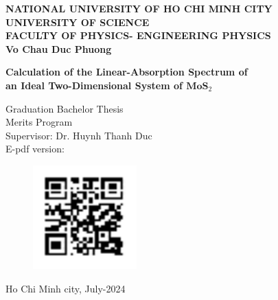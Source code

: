 \documentclass[12pt,english,a4paper]{article}
\begin{document}
	\begin{titlepage}
		\begin{center}
			{\large \textbf{NATIONAL UNIVERSITY OF HO CHI MINH CITY}\\\textbf{UNIVERSITY OF SCIENCE}\\}
			{ \textbf{FACULTY OF PHYSICS- ENGINEERING PHYSICS}}\\[2cm]
			
			
			{ \Large \bfseries Vo Chau Duc Phuong\\[2cm] } 
			
			
			{ \Large \bfseries Calculation of the Linear-Absorption Spectrum of\\ an Ideal Two-Dimensional System of $\mathrm{\textbf{MoS}}_2$\\[3cm]} 
			
			
			\large Graduation Bachelor Thesis\\
			\large Merits Program\\[2cm]
			
			Supervisor: Dr. Huynh Thanh Duc\\[1cm]

			E-pdf version:
			\begin{figure}[h]
				\centering
				\includegraphics[width=4cm]{images/qrgithub.pdf}
			\end{figure}\null
			\vfill
			Ho Chi Minh city, July-2024
		\end{center}
	\end{titlepage}
%			
\end{document}
